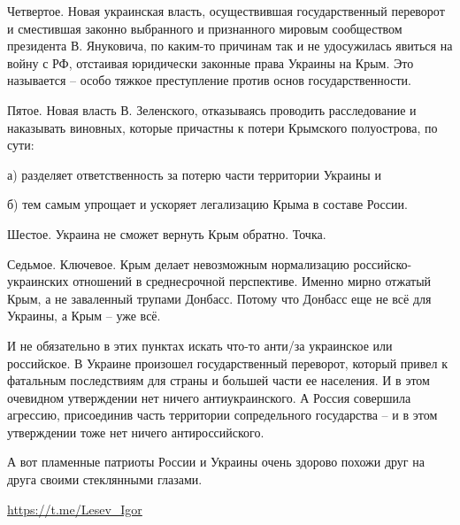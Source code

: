 Четвертое. Новая украинская власть, осуществившая государственный переворот и
сместившая законно выбранного и признанного мировым сообществом президента В.
Януковича, по каким-то причинам так и не удосужилась явиться на войну с РФ,
отстаивая юридически законные права Украины на Крым. Это называется – особо
тяжкое преступление против основ государственности.

Пятое. Новая власть В. Зеленского, отказываясь проводить расследование и
наказывать виновных, которые причастны к потери Крымского полуострова, по сути:

а) разделяет ответственность за потерю части территории Украины и 

б) тем самым упрощает и ускоряет легализацию Крыма в составе России.

Шестое. Украина не сможет вернуть Крым обратно. Точка.

Седьмое. Ключевое. Крым делает невозможным нормализацию российско-украинских
отношений в среднесрочной перспективе. Именно мирно отжатый Крым, а не
заваленный трупами Донбасс. Потому что Донбасс еще не всё для Украины, а Крым –
уже всё.

И не обязательно в этих пунктах искать что-то анти/за украинское или
российское. В Украине произошел государственный переворот, который привел к
фатальным последствиям для страны и большей части ее населения. И в этом
очевидном утверждении нет ничего антиукраинского. А Россия совершила агрессию,
присоединив часть территории сопредельного государства – и в этом утверждении
тоже нет ничего антироссийского.

А вот пламенные патриоты России и Украины очень здорово похожи друг на друга
своими стеклянными глазами.

\url{https://t.me/Lesev_Igor}

